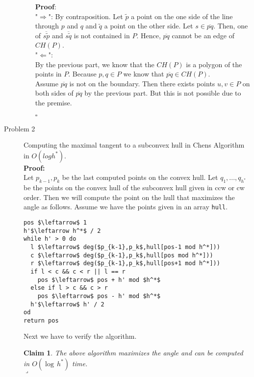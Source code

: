 \documentclass[11pt,a4paper,ngerman]{article}
\newtheorem{lemma}{\bfseries Claim}
\begin{document}
\begin{description}
\begin{enumerate}
          \textbf{Proof}: \\
          "$\Rightarrow$": By contraposition. Let $\tilde{p}$ a point on the one side of the line
                           through $p$ and $q$ and $\tilde{q}$ a point on the other side.
                           Let $s \in \overline{pq}$. Then, one of $\overline{s\tilde{p}}$ 
                           and $\overline{s\tilde{q}}$ is not contained in $P$. Hence,
                           $\overline{pq}$ cannot be an edge of $CH(P)$. \\
          "$\Leftarrow$": \\
		By the previous part, we know that the $CH(P)$ is a polygon
		of the points in $P$. Because $p,q \in P$ we know that 
		$\overline{pq} \in CH(P)$.\\ 

		Assume $\overline{pq}$ is not
		on the boundary. Then there exists points $u,v \in P$
		on both sides of $\overline{pq}$ by the previous part.
		But this is not possible due to the premise.
                
          \mbox{} \hfill $\square$
  \end{enumerate}

\item[Problem 2] Computing the maximal tangent to a subconvex hull in Chens Algorithm in $O(log h^*)$. \\

\textbf{Proof:}\\

Let $p_{k-1}, p_k$ be the last computed points on the convex hull.
Let $q_1, ..., q_{h^*}$ be the points on the convex hull of the subconvex hull
given in ccw or cw order. Then we will compute the point on the hull that
maximizes the angle as follows. Assume we have the points given in an array
\lstinline|hull|.

\begin{lstlisting}[mathescape=true]
pos $\leftarrow$ 1
h'$\leftarrow h^*$ / 2
while h' > 0 do
  l $\leftarrow$ deg($p_{k-1},p_k$,hull[pos-1 mod h^*]))
  c $\leftarrow$ deg($p_{k-1},p_k$,hull[pos mod h^*]))
  r $\leftarrow$ deg($p_{k-1},p_k$,hull[pos+1 mod h^*]))
  if l < c && c < r || l == r
    pos $\leftarrow$ pos + h' mod $h^*$
  else if l > c && c > r
    pos $\leftarrow$ pos - h' mod $h^*$
  h'$\leftarrow$ h' / 2
od
return pos
\end{lstlisting}

Next we have to verify the algorithm.
\begin{lemma}\label{alge:ueb2:logh}
  The above algorithm maximizes the angle and can be
  computed in $O(\log \, h^*)$ time.\\
\mbox{}\hfill$\lrcorner$
\end{lemma}


\end{description}
\end{document}
